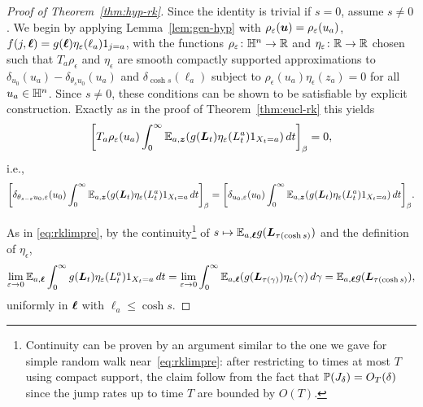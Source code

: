 \documentclass[11pt,a4paper]{article}
\begin{document}
\begin{proof}[ Proof of Theorem~\ref{thm:hyp-rk}]
  Since the identity is trivial if $s=0$, assume $s\neq 0$.  We begin
  by applying Lemma~\ref{lem:gen-hyp} with
  $\rho_{\epsilon}(\V{u}) = \rho_{\epsilon}(u_{a})$,
  $f(j,\V{\ell}) = g(\V{\ell})\eta_{\epsilon}(\ell_a)1_{j=a}$,
  with the functions $\rho_{\epsilon} \colon \HH^n \to \R$ and
  $\eta_{\epsilon} \colon\R\to\R$ chosen such that $T_{a}\rho_{\epsilon}$
  and $\eta_{\epsilon}$ are smooth compactly supported approximations to
  $\delta_{u_{0}}(u_a)-\delta_{\theta_{s}{u_{0}}}(u_a)$ and
  $\delta_{\cosh{s}}(\ell_a)$ subject to $\rho_{\epsilon}(u_a)\eta_{\epsilon}(z_a)=0$ for
  all $u_a\in \HH^n$.  Since $s\neq 0$, these conditions can be shown
  to be satisfiable by explicit construction. Exactly as in the proof
  of Theorem~\ref{thm:eucl-rk} this yields
  \begin{equation}
    \label{eq:RKhyp1a}
    \uspin{T_{a}\rho_{\epsilon}(u_{a})\int_{0}^{\infty}\E_{a,\V{z}}(g(\V{L}_{t})\eta_{\epsilon}(L_{t}^{a}){1_{X_t=a}})\,dt}_{\beta}=0,
  \end{equation}
  i.e.,
  \begin{equation}
 \label{eq:RKhyp1}
 \uspin{\delta_{\theta_{s-\varepsilon} u_0,\varepsilon}(u_0)\int_{0}^{\infty}\E_{a,\V{z}}(g(\V{L}_{t})\eta_{\epsilon}(L_{t}^{a}){ 1_{X_t=a}}\,dt}_{\beta}= \uspin{\delta_{u_0,\varepsilon}(u_0)\int_{0}^{\infty}\E_{a,\V{z}}(g(\V{L}_{t})\eta_{\epsilon}(L_{t}^{a}){ 1_{X_t=a}})\,dt}_{\beta}.
\end{equation}

As in \eqref{eq:rklimpre}, by the continuity\footnote{ Continuity
  can be proven by an argument similar to the one we gave for simple
  random walk near~\eqref{eq:rklimpre}: after restricting to times at
  most $T$ using compact support, the claim follow from the fact that
  $\P(J_\delta) = O_T(\delta)$ since the jump rates up to time $T$ are bounded
  by $O(T)$.} of $s\mapsto \E_{a,\V{\ell}} g(\V{L}_{\tau(\cosh s)})$
and the definition of $\eta_\epsilon$,
\begin{equation} \label{eq:RKhyp-delta}
  \lim_{\epsilon\to 0} 
  \E_{a,\V{\ell}}\int_{0}^{\infty}  g(\V{L}_{t})
  \eta_{\epsilon}(L^{a}_{t})1_{X_{t}=a} \, dt 
  =
  \lim_{\epsilon\to 0} 
  \int_{0}^{\infty} \E_{a,\V{\ell}}( g(\V{L}_{\tau(\gamma)})
  \eta_{\epsilon}(\gamma) \, d\gamma
  = \E_{a,\V{\ell}}g(\V{L}_{\tau(\cosh s)}),
\end{equation}
uniformly in $\V{\ell}$ with $\ell_a \leq \cosh s$.


\end{proof}
\end{document}
